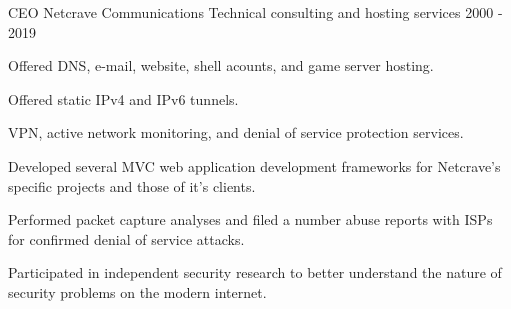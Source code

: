 \begin{cventries}
  \cventry
    {CEO}
    {Netcrave Communications}
    {Technical consulting and hosting services}
    {2000 - 2019}
    {
      \begin{cvitems} 
        \item{Offered DNS, e-mail, website, shell acounts, and game server hosting.}
        \item{Offered static IPv4 and IPv6 tunnels.}
        \item{VPN, active network monitoring, and denial of service protection services.}
        \item{Developed several MVC web application development frameworks for Netcrave's specific projects and those of it's clients.}
        \item{Performed packet capture analyses and filed a number abuse reports with ISPs for confirmed denial of service attacks.}
        \item{Participated in independent security research to better understand the nature of security problems on the modern internet.}
      \end{cvitems}
    }
\end{cventries}
